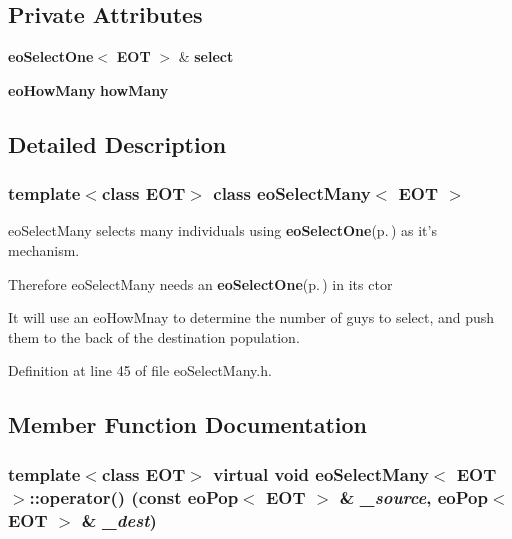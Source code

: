 \subsection*{Private Attributes}
\begin{CompactItemize}
\item 
{\bf eo\-Select\-One}$<$ {\bf EOT} $>$ \& {\bf select}\label{classeo_select_many_r0}

\item 
{\bf eo\-How\-Many} {\bf how\-Many}\label{classeo_select_many_r1}

\end{CompactItemize}


\subsection{Detailed Description}
\subsubsection*{template$<$class EOT$>$ class eo\-Select\-Many$<$ EOT $>$}

eo\-Select\-Many selects many individuals using {\bf eo\-Select\-One}{\rm (p.\,\pageref{classeo_select_one})} as it's mechanism. 

Therefore eo\-Select\-Many needs an {\bf eo\-Select\-One}{\rm (p.\,\pageref{classeo_select_one})} in its ctor

It will use an eo\-How\-Mnay to determine the number of guys to select, and push them to the back of the destination population. 



Definition at line 45 of file eo\-Select\-Many.h.

\subsection{Member Function Documentation}
\subsubsection{\setlength{\rightskip}{0pt plus 5cm}template$<$class EOT$>$ virtual void {\bf eo\-Select\-Many}$<$ {\bf EOT} $>$::operator() (const {\bf eo\-Pop}$<$ {\bf EOT} $>$ \& {\em \_\-source}, {\bf eo\-Pop}$<$ {\bf EOT} $>$ \& {\em \_\-dest})\hspace{0.3cm}{\tt  [inline, virtual]}}\label{classeo_select_many_a2}


